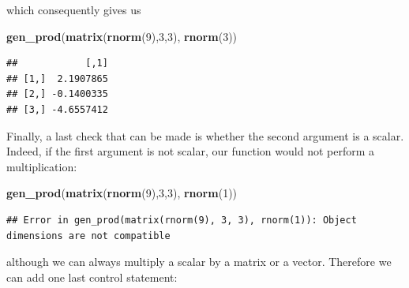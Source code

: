 \documentclass[12pt,]{krantz}
\newenvironment{Shaded}{\begin{snugshade}}{\end{snugshade}}
\newcommand{\KeywordTok}[1]{\textcolor[rgb]{0.27,0.27,0.27}{\textbf{#1}}}
\newcommand{\DecValTok}[1]{\textcolor[rgb]{0.06,0.06,0.06}{#1}}
\newcommand{\NormalTok}[1]{#1}
\begin{document}
which consequently gives us

\begin{Shaded}
\begin{Highlighting}[]
\KeywordTok{gen_prod}\NormalTok{(}\KeywordTok{matrix}\NormalTok{(}\KeywordTok{rnorm}\NormalTok{(}\DecValTok{9}\NormalTok{),}\DecValTok{3}\NormalTok{,}\DecValTok{3}\NormalTok{), }\KeywordTok{rnorm}\NormalTok{(}\DecValTok{3}\NormalTok{))}
\end{Highlighting}
\end{Shaded}

\begin{verbatim}
##            [,1]
## [1,]  2.1907865
## [2,] -0.1400335
## [3,] -4.6557412
\end{verbatim}

Finally, a last check that can be made is whether the second argument is
a scalar. Indeed, if the first argument is not scalar, our function
would not perform a multiplication:

\begin{Shaded}
\begin{Highlighting}[]
\KeywordTok{gen_prod}\NormalTok{(}\KeywordTok{matrix}\NormalTok{(}\KeywordTok{rnorm}\NormalTok{(}\DecValTok{9}\NormalTok{),}\DecValTok{3}\NormalTok{,}\DecValTok{3}\NormalTok{), }\KeywordTok{rnorm}\NormalTok{(}\DecValTok{1}\NormalTok{))}
\end{Highlighting}
\end{Shaded}

\begin{verbatim}
## Error in gen_prod(matrix(rnorm(9), 3, 3), rnorm(1)): Object dimensions are not compatible
\end{verbatim}

although we can always multiply a scalar by a matrix or a vector.
Therefore we can add one last control statement:
\end{document}
